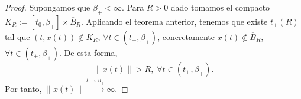 \begin{proof}
	Supongamos que $\displaystyle \beta_{+} <\infty$. Para $\displaystyle R > 0 $ dado tomamos el compacto $\displaystyle K_{R} := \left[t_{0}, \beta_{+}\right] \times\overline{B}_{R} $. Aplicando el teorema anterior, tenemos que existe $\displaystyle t_{+}\left(R\right) $ tal que $\displaystyle \left(t, x\left(t\right)\right)\not\in K_{R} $, $\displaystyle \forall t \in \left(t_{+}, \beta_{+ }\right) $, concretamente $\displaystyle x\left(t\right)\not\in \overline{B}_{R} $, $\displaystyle \forall t \in \left(t_{+}, \beta_{+}\right) $. 
	De esta forma, 
	\[ \|x\left(t\right)\| > R, \; \forall t \in \left(t_{+}, \beta_{+}\right) .\]
	Por tanto, $\displaystyle \|x\left(t\right)\| \xrightarrow{t \to \beta_{+}} \infty$.	
\end{proof}

